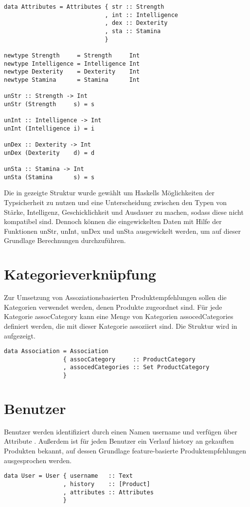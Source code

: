\begin{lstlisting}[label=code:Attributes,caption=Struktur von \textsf{Attributes} und zugehörige Zugriffsfunktionen]
data Attributes = Attributes { str :: Strength
                             , int :: Intelligence
                             , dex :: Dexterity
                             , sta :: Stamina
                             }

newtype Strength     = Strength     Int
newtype Intelligence = Intelligence Int
newtype Dexterity    = Dexterity    Int
newtype Stamina      = Stamina      Int

unStr :: Strength -> Int
unStr (Strength     s) = s

unInt :: Intelligence -> Int
unInt (Intelligence i) = i

unDex :: Dexterity -> Int
unDex (Dexterity    d) = d

unSta :: Stamina -> Int
unSta (Stamina      s) = s
\end{lstlisting}
Die in  gezeigte Struktur wurde gewählt um Haskells Möglichkeiten der Typsicherheit zu nutzen und eine Unterscheidung zwischen den Typen von Stärke, Intelligenz, Geschicklichkeit und Ausdauer zu machen, sodass diese nicht kompatibel sind. Dennoch können die eingewickelten Daten mit Hilfe der Funktionen \textsf{unStr}, \textsf{unInt}, \textsf{unDex} und \textsf{unSta} ausgewickelt werden, um auf dieser Grundlage Berechnungen durchzuführen.


\section{Kategorieverknüpfung}
Zur Umsetzung von Assoziationsbasierten Produktempfehlungen sollen die Kategorien verwendet werden, denen Produkte zugeordnet sind. Für jede Kategorie \textsf{assocCategory} kann eine Menge von Kategorien \textsf{assocedCategories} definiert werden, die mit dieser Kategorie assoziiert sind. Die Struktur wird in  aufgezeigt.

\begin{lstlisting}[label=code:Association,caption=Struktur von \textsf{Association}]
data Association = Association
                 { assocCategory     :: ProductCategory
                 , assocedCategories :: Set ProductCategory
                 }
\end{lstlisting}


\section{Benutzer}
Benutzer werden identifiziert durch einen Namen \textsf{username} und verfügen über Attribute . Außerdem ist für jeden Benutzer ein Verlauf \textsf{history} an gekauften Produkten bekannt, auf dessen Grundlage feature-basierte Produktempfehlungen ausgesprochen werden.
\begin{lstlisting}[label=code:User,caption=Struktur vom \textsf{User}]
data User = User { username   :: Text
                 , history    :: [Product]
                 , attributes :: Attributes
                 }
\end{lstlisting}